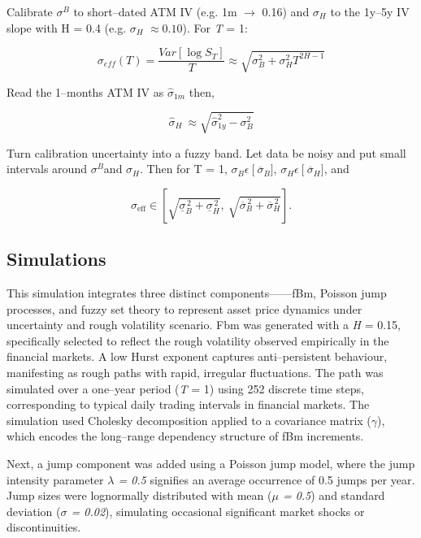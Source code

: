 \documentclass[12pt,a4paper]{report}
\numberwithin{equation}{section}
\begin{document}
Calibrate \(\sigma^{B}\) to short--dated ATM IV (e.g. 1m $\rightarrow$ 0.16) and
\(\sigma_{H}\) to the 1y--5y IV slope with H = 0.4 (e.g.
\(\sigma_{H\ \ } \approx 0.10\)). For \emph{T} = 1:

\[\sigma_{eff}(T) = \frac{Var\left\lbrack \log S_{T} \right\rbrack}{T} \approx \sqrt{\sigma_{B}^{2} + \sigma_{H}^{2}T^{2H - 1}}\]

Read the 1--months ATM IV as \({\widehat{\sigma}}_{1m}\) then,

\[{\widehat{\sigma}}_{H}\  \approx \sqrt{{\widehat{\sigma}}_{1y}^{2} - \sigma_{B}^{2}}\]

Turn calibration uncertainty into a fuzzy band. Let data be noisy and
put small intervals around \(\sigma^{B}\)and \(\sigma_{H}\). Then for T
= 1, \(\sigma_{B}\epsilon\ \lbrack\ {\overline{\sigma}}_{B}\rbrack\),
\(\sigma_{H}\epsilon\ \lbrack\ {\overline{\sigma}}_{H}\rbrack\), and

\[
\sigma_{\mathrm{eff}} \in
\left[
\sqrt{\underline{\sigma}_{B}^{\,2}+\underline{\sigma}_{H}^{\,2}},
\ \sqrt{\overline{\sigma}_{B}^{\,2}+\overline{\sigma}_{H}^{\,2}}
\right].
\]


\hypertarget{simulations}{%
\subsection{Simulations}\label{simulations}}

This simulation integrates three distinct components------fBm, Poisson jump
processes, and fuzzy set theory to represent asset price dynamics under
uncertainty and rough volatility scenario. Fbm was generated with a
\emph{H} = 0.15, specifically selected to reflect the rough volatility
observed empirically in the financial markets. A low Hurst exponent
captures anti--persistent behaviour, manifesting as rough paths with
rapid, irregular fluctuations. The path was simulated over a one--year
period (\emph{T} = 1) using 252 discrete time steps, corresponding to
typical daily trading intervals in financial markets. The simulation
used Cholesky decomposition applied to a covariance matrix (\emph{$\gamma$}),
which encodes the long--range dependency structure of fBm increments.

Next, a jump component was added using a Poisson jump model, where the
jump intensity parameter \emph{$\lambda$ = 0.5} signifies an average occurrence
of 0.5 jumps per year. Jump sizes were lognormally distributed with mean
(\emph{$\mu$ = 0.5}) and standard deviation (\emph{$\sigma$ = 0.02}), simulating
occasional significant market shocks or discontinuities.
\end{document}
